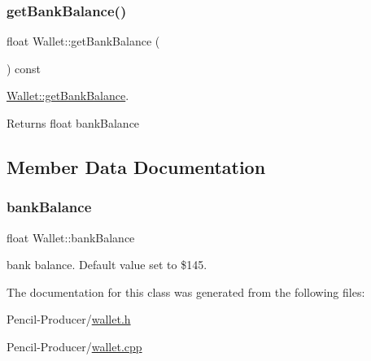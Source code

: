 \subsubsection{\texorpdfstring{getBankBalance()}{getBankBalance()}}
{\footnotesize\ttfamily float Wallet\+::get\+Bank\+Balance (\begin{DoxyParamCaption}{ }\end{DoxyParamCaption}) const}



\mbox{\hyperlink{classWallet_a92536035a1de76dc7842693beb93cd24}{Wallet\+::get\+Bank\+Balance}}. 

\begin{DoxyReturn}{Returns}
float bank\+Balance 
\end{DoxyReturn}


\subsection{Member Data Documentation}
\mbox{\label{classWallet_a586fc4e3fb0e9ce59e5bbafd9145d319}} 
\subsubsection{\texorpdfstring{bankBalance}{bankBalance}}
{\footnotesize\ttfamily float Wallet\+::bank\+Balance\hspace{0.3cm}{\ttfamily [private]}}



bank balance. Default value set to \$145. 



The documentation for this class was generated from the following files\+:\begin{DoxyCompactItemize}
\item 
Pencil-\/\+Producer/\mbox{\hyperlink{wallet_8h}{wallet.\+h}}\item 
Pencil-\/\+Producer/\mbox{\hyperlink{wallet_8cpp}{wallet.\+cpp}}\end{DoxyCompactItemize}
